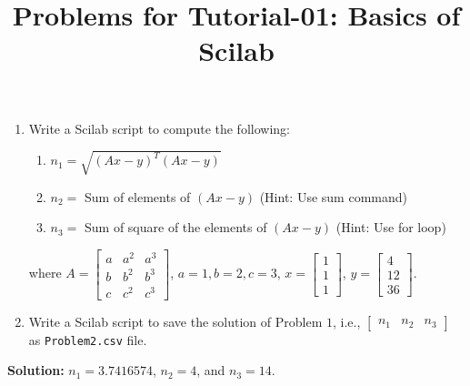 \documentclass[10pt,a4paper]{article}
\begin{document}
\title{Problems for Tutorial-01: Basics of Scilab}
\date{}
\maketitle
\begin{enumerate}
\item Write a Scilab script to compute the following:
\begin{enumerate}
\item $n_1 = \sqrt{(Ax - y)^T(Ax - y)}$
\item $n_2 = $ Sum of elements of $(Ax-y)$ (Hint: Use sum command)
\item $n_3 = $ Sum of square of the elements of $(Ax - y)$ (Hint: Use for loop)
\end{enumerate}
where $A = \begin{bmatrix}a & a^2 & a^3\\b & b^2 & b^3\\c & c^2 & c^3\end{bmatrix}$, 
$a = 1, b = 2, c = 3$, $x = \begin{bmatrix}1\\1\\1\end{bmatrix}$, 
$y = \begin{bmatrix}4\\12\\36\end{bmatrix}$.
\item Write a Scilab script to save the solution of Problem $1$, i.e., 
$\begin{bmatrix}n_1 & n_2 & n_3\end{bmatrix}$ as \verb'Problem2.csv' file.
\end{enumerate}
{\bf Solution:} $n_1 = 3.7416574$, $n_2 = 4$, and $n_3 = 14$.
\end{document}
